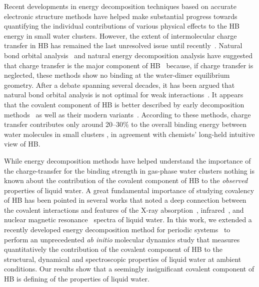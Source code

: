 \documentclass[aps,prl,reprint,amsmath,amssymb]{revtex4-1}
\begin{document}
Recent developments in energy decomposition techniques based on accurate electronic structure methods have helped make substantial progress towards quantifying the individual contributions of various physical effects to the HB energy in small water clusters. 
However, the extent of intermolecular charge transfer in HB has remained the last unresolved issue until recently~\cite{isaacs1999covalency,ghanty2000hydrogen,stone2017natural}. 
Natural bond orbital analysis~\cite{weinhold1998natural} and natural energy decomposition analysis \cite{glendening1994natural} have suggested that charge transfer is the major component of HB~\cite{schenter1996natural,glendening2005natural,weinhold2005resonance} because, if charge transfer is neglected, these methods show no binding at the water-dimer equilibrium geometry. 
After a debate spanning several decades, it has been argued that natural bond orbital analysis is not optimal for weak interactions~\cite{stone2017natural}. 
It appears that the covalent component of HB is better described by early decomposition methods~\cite{kitaura1976new,bagus1984new,bagus1992decomposition,stevens1987frozen,chen1996energy,stone1993imptct} as well as their modern variants~\cite{mo2000energy,misquitta2003dispersion,khaliullin2007unravelling,misquitta2013saptdftct}. 
According to these methods, charge transfer contributes only around 20--30\% to the overall binding energy between water molecules in small clusters \cite{stevens1987frozen,Stone1993imptct,chen1996energy,piquemal2005csov,khaliullin2009electron,cobar2012examination}, in agreement with chemists' long-held intuitive view of HB.



While energy decomposition methods have helped understand the importance of the charge-transfer for the binding strength in gas-phase water clusters nothing is known about the contribution of the covalent component of HB to the \emph{observed} properties of liquid water. 
A great fundamental importance of studying covalency of HB has been pointed in several works that noted a deep connection between the covalent interactions and features of the X-ray absorption~\cite{NatureComm2013}, infrared~\cite{JPCL2013}, and nuclear magnetic resonance~\cite{NatureComm2015} spectra of liquid water. 
In this work, we extended a recently developed energy decomposition method for periodic systems~\cite{Khaliullin2013JCTC} to perform an unprecedented \emph{ab initio} molecular dynamics study that measures quantitatively the contribution of the covalent component of HB to the structural, dynamical and spectroscopic properties of liquid water at ambient conditions. 
Our results show that a seemingly insignificant covalent component of HB is defining of the properties of liquid water. 
\end{document}
